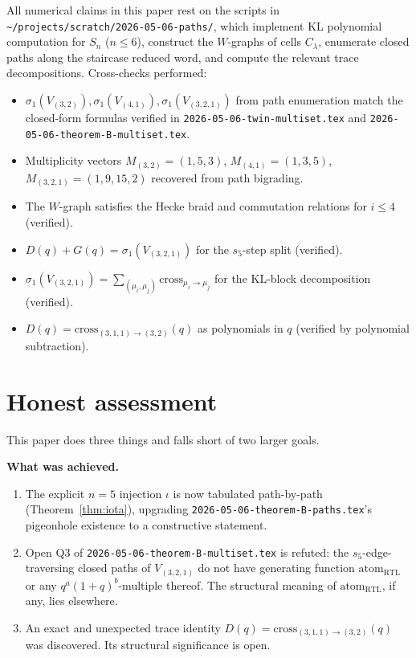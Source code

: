 \documentclass[11pt]{article}
\theoremstyle{definition}
\begin{document}
All numerical claims in this paper rest on the scripts in \texttt{\textasciitilde/projects/scratch/2026-05-06-paths/}, which implement KL polynomial computation for $S_n$ ($n \leq 6$), construct the $W$-graphs of cells $C_\lambda$, enumerate closed paths along the staircase reduced word, and compute the relevant trace decompositions. Cross-checks performed:
\begin{itemize}[leftmargin=2em,topsep=0.2em,itemsep=0.1em]
\item $\sigma_1(V_{(3,2)}), \sigma_1(V_{(4,1)}), \sigma_1(V_{(3,2,1)})$ from path enumeration match the closed-form formulas verified in \texttt{2026-05-06-twin-multiset.tex} and \texttt{2026-05-06-theorem-B-multiset.tex}.
\item Multiplicity vectors $M_{(3,2)} = (1,5,3)$, $M_{(4,1)} = (1,3,5)$, $M_{(3,2,1)} = (1,9,15,2)$ recovered from path bigrading.
\item The $W$-graph satisfies the Hecke braid and commutation relations for $i \leq 4$ (verified).
\item $D(q) + G(q) = \sigma_1(V_{(3,2,1)})$ for the $s_5$-step split (verified).
\item $\sigma_1(V_{(3,2,1)}) = \sum_{(\mu_i,\mu_j)} \mathrm{cross}_{\mu_i \to \mu_j}$ for the KL-block decomposition (verified).
\item $D(q) = \mathrm{cross}_{(3,1,1)\to(3,2)}(q)$ as polynomials in $q$ (verified by polynomial subtraction).
\end{itemize}

\section*{Honest assessment}

This paper does three things and falls short of two larger goals.

\textbf{What was achieved.}
\begin{enumerate}[leftmargin=2em,topsep=0.3em,itemsep=0.2em]
\item The explicit $n=5$ injection $\iota$ is now tabulated path-by-path (Theorem~\ref{thm:iota}), upgrading \texttt{2026-05-06-theorem-B-paths.tex}'s pigeonhole existence to a constructive statement.
\item Open Q3 of \texttt{2026-05-06-theorem-B-multiset.tex} is refuted: the $s_5$-edge-traversing closed paths of $V_{(3,2,1)}$ do not have generating function $\mathrm{atom}_{\mathrm{RTL}}$ or any $q^a(1+q)^b$-multiple thereof. The structural meaning of $\mathrm{atom}_{\mathrm{RTL}}$, if any, lies elsewhere.
\item An exact and unexpected trace identity $D(q) = \mathrm{cross}_{(3,1,1)\to(3,2)}(q)$ was discovered. Its structural significance is open.
\end{enumerate}
\end{document}

